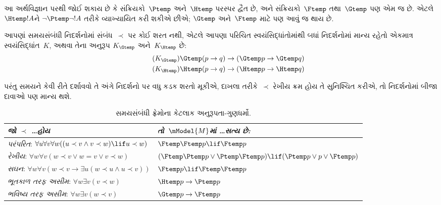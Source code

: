 આ અર્થવિજ્ઞાન પરથી જોઈ શકાય છે કે સંક્રિયકો~$\Ptemp$ અને~$\Htemp$
પરસ્પર દ્વૈત છે, અને સંક્રિયકો~$\Ftemp$ તથા~$\Gtemp$ પણ એમ જ છે.
એટલે $\Htemp  !A$ને $\lnot \Ptemp \lnot !A$ તરીકે વ્યાખ્યાયિત
કરી શકીએ છીએ; $\Gtemp$ અને~$\Ftemp$ માટે પણ આવું જ થાય છે.
\endgroup

\begingroup
\makeatletter{}\makeatother


\label{guunit:OLP-0479}


આપણાં સમયસંબંધી નિદર્શનોમાં સંબંધ~$\prec$ પર કોઈ શરત નથી,
એટલે આપણા પરિચિત સ્વયંસિદ્ધાંતોમાંથી બધાં નિદર્શનોમાં માન્ય
રહેતો એકમાત્ર સ્વયંસિદ્ધાંત~$K$, અથવા તેના અનુરૂપ
$K_{\Gtemp}$ અને~$K_{\Htemp}$ છે:
\begin{align*}
\tag{$K_{\Gtemp}$}  \Gtemp (p \to q) & \to (\Gtemp p \to \Gtemp q)\\
\tag{$K_{\Htemp}$}  \Htemp (p \to q) & \to (\Htemp p \to \Htemp q)
\end{align*}

પરંતુ સમયને કેવી રીતે દર્શાવવો તે અંગે નિદર્શનો પર વધુ કડક
શરતો મૂકીએ, દાખલા તરીકે~$\prec$ રેખીય ક્રમ હોય તે સુનિશ્ચિત
કરીએ, તો નિદર્શનોમાં બીજા દાવાઓ પણ માન્ય થશે.

\begin{table}[t]
  \begin{tabular}{| p{.47\linewidth} || p{.47\linewidth} |}
    \hline
    {\emph{જો $\prec$ \dots હોય}} & {\emph{તો~$\mModel{M}$માં \dots સત્ય છે:}} \\
    \hline \hline
    \emph{પરંપરિત}: \newline
    $\forall u \forall v \forall w ((u \prec v \land v \prec w) \lif u \prec w)$ & 
    $\Ftemp \Ftemp p \lif \Ftemp p$  \\
    \hline 
    \emph{રેખીય}: \newline
    $\forall w \forall v (w \prec v \lor w = v \lor v \prec w)$ &  
    $(\Ftemp \Ptemp  p \lor \Ptemp \Ftemp p) \lif (\Ptemp p \lor p \lor \Ftemp p)$\\
    \hline
    \emph{સઘન}: \newline
    $\forall w \forall v (w \prec v \to \exists u(w \prec u \land u \prec v))$ &  
    $\Ftemp p \lif \Ftemp \Ftemp p$ \\
    \hline
    \emph{ભૂતકાળ તરફ અસીમ}: \newline
    $\forall w \exists v( v \prec w)$ &  
    $\Htemp p \to \Ptemp p$ \\
    \hline
    \emph{ભવિષ્ય તરફ અસીમ}: \newline
    $\forall w \exists v( w \prec v)$ &  
    $\Gtemp p \to \Ftemp p$ \\
    \hline
  \end{tabular}
  \caption{સમયસંબંધી ફ્રેમોના કેટલાક અનુરૂપતા-ગુણધર્મો.}
\end{table} 

